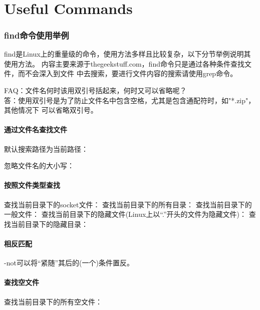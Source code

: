 ﻿\documentclass[a4paper,11pt]{article}
\begin{document}
  \tt %
  \pagestyle{header}
  \sybmaketitle
  \tableofcontents
  \newpage

  \pagestyle{main}
  \setcounter{page}{1}

  \part[Useful Commands]{Useful Commands}
  \section[find命令使用举例]{find命令使用举例}
  find是Linux上的重量级的命令，使用方法多样且比较复杂，以下分节举例说明其使用方法。
  内容主要来源于thegeekstuff.com，find命令只是通过各种条件查找文件，而不会深入到文件
  中去搜索，要进行文件内容的搜索请使用grep命令。\par
  \bigskip
  FAQ：文件名何时该用双引号括起来，何时又可以省略呢？\\
  答：使用双引号是为了防止文件名中包含空格，尤其是包含通配符时，如"*.zip"，其他情况下
  可以省略双引号。

  \subsection[通过文件名查找文件]{通过文件名查找文件}
  默认搜索路径为当前路径：

  忽略文件名的大小写：

  \subsection[按照文件类型查找]{按照文件类型查找}
  查找当前目录下的socket文件：
  查找当前目录下的所有目录：
  查找当前目录下的一般文件：
  查找当前目录下的隐藏文件(Linux上以“.”开头的文件为隐藏文件)：
  查找当前目录下的隐藏目录：

  \subsection[相反匹配]{相反匹配}
  -not可以将“紧随”其后的(一个)条件置反。

  \subsection[查找空文件]{查找空文件}
  查找当前目录下的所有空文件：
\end{document}
